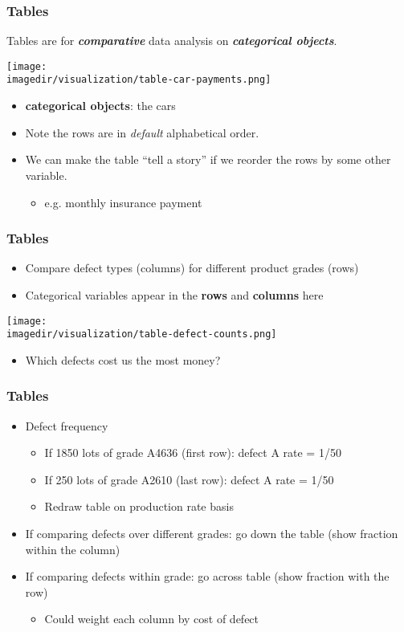 \begin{frame}\frametitle{Tables}
	
	Tables are for \textbf{\emph{comparative}} data analysis on \textbf{\emph{categorical objects}}.
	\begin{center}
		\texttt{[image: \\imagedir/visualization/table-car-payments.png]}
	\end{center}
	\begin{itemize}
		\item	\textbf{categorical objects}: the cars
		\item	Note the rows are in \emph{default} alphabetical order. 
		\item	We can make the table ``tell a story'' if we reorder the rows by some other variable. 
		\begin{itemize}
			\item	e.g. monthly insurance payment 
		\end{itemize}
	\end{itemize}
\end{frame}

\begin{frame}\frametitle{Tables}
	\begin{itemize}
		\item	Compare defect types (columns) for different product grades (rows)
		\item	Categorical variables appear in the \textbf{rows} and \textbf{columns} here
	\end{itemize}
	\begin{center}
		\texttt{[image: \\imagedir/visualization/table-defect-counts.png]}
	\end{center}
	\vspace{-12pt}
	\begin{itemize}
		\item	Which defects cost us the most money? 
	\end{itemize}
\end{frame}

\begin{frame}\frametitle{Tables}
	\begin{itemize}
		\item	Defect frequency 
		\begin{itemize}
			\item	If 1850 lots of grade A4636 (first row): defect A rate = 1/50 
			\item	If 250 lots of grade A2610 (last row): defect A rate = 1/50 
			\item	Redraw table on production rate basis 
		\end{itemize}
		\item	If comparing defects over different grades: go down the table (show fraction within the column) 
		\item	If comparing defects within grade: go across table (show fraction with the row) 
		\begin{itemize}
			\item	Could weight each column by cost of defect 
		\end{itemize}
	\end{itemize}
\end{frame}


